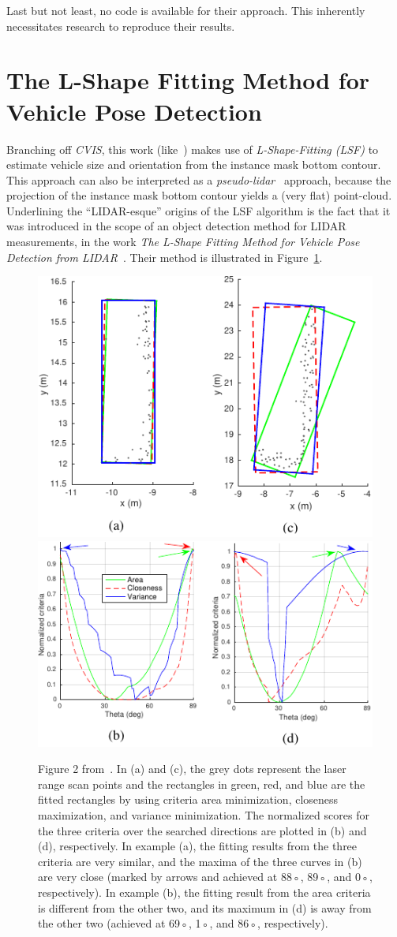 Last but not least, no code is available for their approach.
This inherently necessitates research to reproduce their results.

\section{The L-Shape Fitting Method for Vehicle Pose Detection}
\label{sec:related-lshape-fitting}

Branching off \textit{CVIS}, this work (like~\cite{leonthesis}) makes use of \textit{L-Shape-Fitting (LSF)} to estimate vehicle size and orientation from the instance mask bottom contour.
This approach can also be interpreted as a \textit{pseudo-lidar}~\cite{survey2022} approach, because the projection of the instance mask bottom contour yields a (very flat) point-cloud.
Underlining the \enquote{LIDAR-esque} origins of the LSF algorithm is the fact that it was introduced in the scope of an object detection method for LIDAR measurements, in the work \textit{The L-Shape Fitting Method for Vehicle Pose Detection from LIDAR}~\cite{zhang2017efficient}.
Their method is illustrated in Figure~\ref{fig:related-lsf}.

\begin{figure}[htb]
    \centering
    \includegraphics[width=0.49\linewidth]{figures/l_shape_fitting_fig_2_1-cropped}
    \includegraphics[width=0.49\linewidth]{figures/l_shape_fitting_fig_2_2-cropped}
    \caption{Figure 2 from~\cite{zhang2017efficient}. In (a) and (c), the grey dots represent the laser range scan points and the rectangles in green, red, and blue are the fitted rectangles by using criteria area minimization, closeness maximization, and variance minimization. The normalized scores for the three criteria over the searched directions are plotted in (b) and (d), respectively. In example (a), the fitting results from the three criteria are very similar, and the maxima of the three curves in (b) are very close (marked by arrows and achieved at 88◦, 89◦, and 0◦, respectively). In example (b), the fitting result from the area criteria is different from the other two, and its maximum in (d) is away from the other two (achieved at 69◦, 1◦, and 86◦, respectively).}
    \label{fig:related-lsf}
\end{figure}

